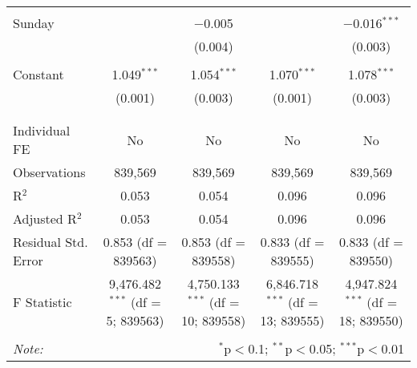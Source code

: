 \documentclass[
]{article}
\begin{document}
\begin{table}[!htbp]
{\begin{tabular}{@{\extracolsep{5pt}}lcccc}
  & & & & \\ 
 Sunday &  & $-$0.005 &  & $-$0.016$^{***}$ \\ 
  &  & (0.004) &  & (0.003) \\ 
  & & & & \\ 
 Constant & 1.049$^{***}$ & 1.054$^{***}$ & 1.070$^{***}$ & 1.078$^{***}$ \\ 
  & (0.001) & (0.003) & (0.001) & (0.003) \\ 
  & & & & \\ 
\hline \\[-1.8ex] 
Individual FE & No & No & No & No \\ 
Observations & 839,569 & 839,569 & 839,569 & 839,569 \\ 
R$^{2}$ & 0.053 & 0.054 & 0.096 & 0.096 \\ 
Adjusted R$^{2}$ & 0.053 & 0.054 & 0.096 & 0.096 \\ 
Residual Std. Error & 0.853 (df = 839563) & 0.853 (df = 839558) & 0.833 (df = 839555) & 0.833 (df = 839550) \\ 
F Statistic & 9,476.482$^{***}$ (df = 5; 839563) & 4,750.133$^{***}$ (df = 10; 839558) & 6,846.718$^{***}$ (df = 13; 839555) & 4,947.824$^{***}$ (df = 18; 839550) \\ 
\hline 
\hline \\[-1.8ex] 
\textit{Note:}  & \multicolumn{4}{r}{$^{*}$p$<$0.1; $^{**}$p$<$0.05; $^{***}$p$<$0.01} \\ 
\end{tabular}
} 
\end{table} 
\newpage
\end{document}

